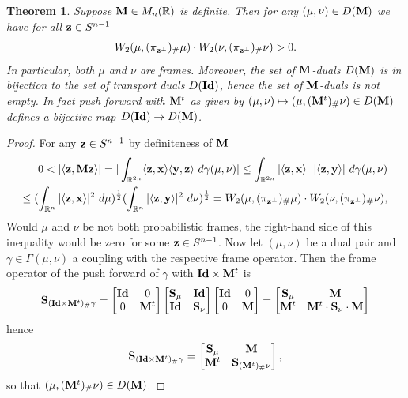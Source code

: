 \documentclass{amsart}
\numberwithin{equation}{section}
\newcommand\bA{{\bf A}}
\newcommand\bM{{\bf M}}
\newcommand\bS{{\bf S}}
\newcommand\R{{\mathbb R}}
\newcommand\id{{\operatorname{\bf Id}}}
\theoremstyle{plain}
\newtheorem{theorem}[subsection]{Theorem}
\theoremstyle{definition}
\begin{document}
\begin{theorem}
Suppose $\bM \in M_n(\R)$ is definite. 
Then for any $(\mu,\nu) \in D(\bM)$  we have for all ${\bf z} \in S^{n-1}$
\[W_2(\mu, (\pi_{{\bf z}^{\perp}})_{\#}\mu)\cdot W_2(\nu, (\pi_{{\bf z}^{\perp}})_{\#}\nu) >0.  \]
In particular, both $\mu$ and $\nu$ are frames. Moreover, the set of  $\bM$-duals  $D(\bM)$ is in bijection to the set of transport duals $D(\id)$, 
hence the set of $\bM$-duals is not empty. In fact 
push forward with $\bM^t$ as given by $(\mu, \nu)  \mapsto (\mu, (\bM^t)_{\#}\nu) \in D(\bM)$ defines a bijective map $D(\id) \rightarrow D(\bM)$.  
\end{theorem}
\begin{proof}
For any ${\bf z} \in S^{n-1}$ by definiteness of $\bM$    
\begin{equation}
\begin{split} 
0 < |\langle {\bf z}, \bM {\bf z}\rangle| =|\int_{\R^{2n}} \langle {\bf z},{\bf x} \rangle \langle {\bf y}, {\bf z} \rangle \ d\gamma(\mu, \nu)| \leq \int_{\R^{2n}} |\langle {\bf z},{\bf x} \rangle| \ |\langle {\bf z}, {\bf y} \rangle| \ d\gamma(\mu, \nu)\\
\leq (\int_{\R^{n}} |\langle {\bf z},{\bf x} \rangle|^2 \ d\mu)^{\frac{1}{2}}(\int_{\R^{n}} |\langle {\bf z}, {\bf y} \rangle|^2 \ d\nu)^{\frac{1}{2}}=W_2(\mu, (\pi_{{\bf z}^{\perp}})_{\#}\mu)\cdot W_2(\nu, (\pi_{{\bf z}^{\perp}})_{\#}\nu), 
\end{split}
\end{equation}
Would $\mu$ and $\nu$ be not both probabilistic frames, the right-hand side of this inequality would be zero for some ${\bf z} \in S^{n-1}$. 
Now let $(\mu, \nu)$ be a dual pair and $\gamma \in \Gamma(\mu, \nu)$ a coupling with the respective frame operator. Then the frame operator 
of the push forward of $\gamma$ with ${\bf \id} \times \bM^t$ is 
\[ 
{\bf S}_{({\bf \id} \times \bM^t)_{\#}\gamma}=\begin{bmatrix}
\id & 0 \\
0 & \bM^t
\end{bmatrix}
\begin{bmatrix}
\bS_{\mu} & \id \\
\id & \bS_{\nu}
\end{bmatrix}
\begin{bmatrix}
\id & 0 \\
0 & \bM
\end{bmatrix}
=
\begin{bmatrix}
\bS_{\mu} & \bM \\
\bM^t & \bM^t \cdot \bS_{\nu} \cdot \bM 
\end{bmatrix}
\]
hence 
\[ {\bf S}_{({\bf \id} \times \bM^t)_{\#}\gamma} = 
\begin{bmatrix}
\bS_{\mu} & \bM \\
\bM^t  & \bS_{(\bM^t)_{\#}\nu}  
\end{bmatrix}, 
\]
so that $(\mu, (\bM^t)_{\#}\nu) \in D(\bM)$.  
\end{proof}
\end{document}

